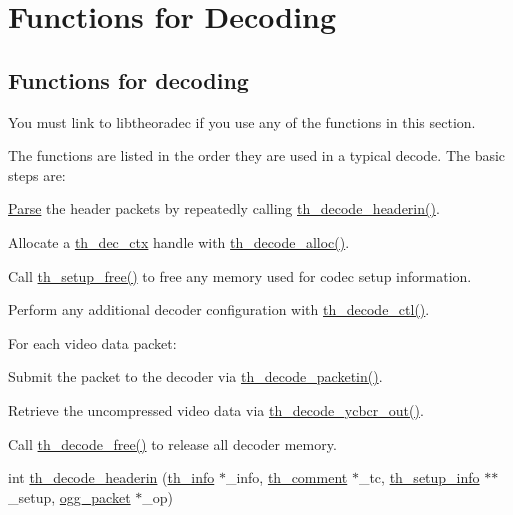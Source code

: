 \hypertarget{group__decfuncs}{\section{Functions for Decoding}
\label{group__decfuncs}
}
\subsection*{Functions for decoding}
\label{_amgrp9d29c94aa62f20426aa5ff062c7daedd}%
You must link to {\ttfamily libtheoradec} if you use any of the functions in this section.

The functions are listed in the order they are used in a typical decode. The basic steps are\+:
\begin{DoxyItemize}
\item \hyperlink{struct_parse}{Parse} the header packets by repeatedly calling \hyperlink{group__decfuncs_ga006d01d36fbe64768c571e6a12b7fc50}{th\+\_\+decode\+\_\+headerin()}.
\item Allocate a \hyperlink{structth__dec__ctx}{th\+\_\+dec\+\_\+ctx} handle with \hyperlink{group__decfuncs_ga0ef07a9a97849054aa606c595a2d807e}{th\+\_\+decode\+\_\+alloc()}.
\item Call \hyperlink{group__decfuncs_gadef55431b68aaa59d0d7b32b2f118f27}{th\+\_\+setup\+\_\+free()} to free any memory used for codec setup information.
\item Perform any additional decoder configuration with \hyperlink{group__decfuncs_ga1a8051958d75b1012573b6e3c8f670e1}{th\+\_\+decode\+\_\+ctl()}.
\item For each video data packet\+:
\begin{DoxyItemize}
\item Submit the packet to the decoder via \hyperlink{group__decfuncs_ga31c814bf09b2232aff69c57ae20f04eb}{th\+\_\+decode\+\_\+packetin()}.
\item Retrieve the uncompressed video data via \hyperlink{group__decfuncs_gaa9cc8af63fa8540e0fc95572f259cdcb}{th\+\_\+decode\+\_\+ycbcr\+\_\+out()}.
\end{DoxyItemize}
\item Call \hyperlink{group__decfuncs_gafb6684ad8ba507b71112bc9de148e7d0}{th\+\_\+decode\+\_\+free()} to release all decoder memory. 
\end{DoxyItemize}\begin{DoxyCompactItemize}
\item 
int \hyperlink{group__decfuncs_ga006d01d36fbe64768c571e6a12b7fc50}{th\+\_\+decode\+\_\+headerin} (\hyperlink{structth__info}{th\+\_\+info} $\ast$\+\_\+info, \hyperlink{structth__comment}{th\+\_\+comment} $\ast$\+\_\+tc, \hyperlink{structth__setup__info}{th\+\_\+setup\+\_\+info} $\ast$$\ast$\+\_\+setup, \hyperlink{structogg__packet}{ogg\+\_\+packet} $\ast$\+\_\+op)
$$
\end{DoxyCompactItemize}
